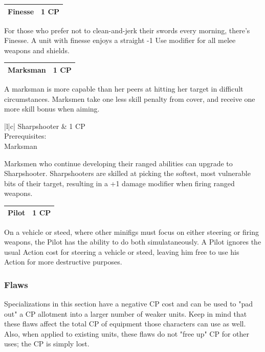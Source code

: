 \documentclass[12pt,a4paper,twocolumn]{article}
\begin{document}
\begin{tabular}{|l|c|} \hline
Finesse & 1 CP \\ \hline
\end{tabular}

For those who prefer not to clean-and-jerk their swords every morning, there's Finesse.  A unit with finesse enjoys a straight -1 Use modifier for all melee weapons and shields.

\begin{tabular}{|l|c|} \hline
Marksman & 1 CP \\ \hline
\end{tabular}

A marksman is more capable than her peers at hitting her target in difficult circumstances.  Marksmen take one less skill penalty from cover, and receive one more skill bonus when aiming.

\begin{tabular}{|l|c|} \hline
Sharpshooter & 1 CP \\ \hline
{} {Prerequisites: } \\
 {Marksman } \\ \hline
\end{tabular}

Marksmen who continue developing their ranged abilities can upgrade to Sharpshooter.  Sharpshooters are skilled at picking the softest, most vulnerable bits of their target, resulting in a +1 damage modifier when firing ranged weapons.

\begin{tabular}{|l|c|} \hline
Pilot & 1 CP \\ \hline
\end{tabular}

On a vehicle or steed, where other minifigs must focus on either steering or firing weapons, the Pilot has the ability to do both simulataneously.  A Pilot ignores the usual Action cost for steering a vehicle or steed, leaving him free to use his Action for more destructive purposes.

\subsubsection{Flaws}

Specializations in this section have a negative CP cost and can be used to "pad out" a CP allotment into a larger number of weaker units.  Keep in mind that these flaws affect the total CP of equipment those characters can use as well.  Also, when applied to existing units, these flaws do not "free up" CP for other uses; the CP is simply lost.
\end{document}

